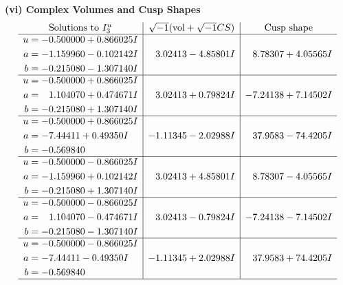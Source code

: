 \documentclass[1p]{elsarticle_modified}
\theoremstyle{definition}
\newcommand{\I}{\sqrt{-1}}
\begin{document}
\newpage\flushleft \textbf{(vi) Complex Volumes and Cusp Shapes}
$$\begin{array}{c|c|c}  
\text{Solutions to }I^u_{3}& \I (\text{vol} + \sqrt{-1}CS) & \text{Cusp shape}\\
 \hline 
\begin{aligned}
u &= -0.500000 + 0.866025 I \\
a &= -1.159960 - 0.102142 I \\
b &= -0.215080 - 1.307140 I\end{aligned}
 & \phantom{-}3.02413 - 4.85801 I & \phantom{-}8.78307 + 4.05565 I \\ \hline\begin{aligned}
u &= -0.500000 + 0.866025 I \\
a &= \phantom{-}1.104070 + 0.474671 I \\
b &= -0.215080 + 1.307140 I\end{aligned}
 & \phantom{-}3.02413 + 0.79824 I & -7.24138 + 7.14502 I \\ \hline\begin{aligned}
u &= -0.500000 + 0.866025 I \\
a &= -7.44411 + 0.49350 I \\
b &= -0.569840\phantom{ +0.000000I}\end{aligned}
 & -1.11345 - 2.02988 I & \phantom{-}37.9583 - 74.4205 I \\ \hline\begin{aligned}
u &= -0.500000 - 0.866025 I \\
a &= -1.159960 + 0.102142 I \\
b &= -0.215080 + 1.307140 I\end{aligned}
 & \phantom{-}3.02413 + 4.85801 I & \phantom{-}8.78307 - 4.05565 I \\ \hline\begin{aligned}
u &= -0.500000 - 0.866025 I \\
a &= \phantom{-}1.104070 - 0.474671 I \\
b &= -0.215080 - 1.307140 I\end{aligned}
 & \phantom{-}3.02413 - 0.79824 I & -7.24138 - 7.14502 I \\ \hline\begin{aligned}
u &= -0.500000 - 0.866025 I \\
a &= -7.44411 - 0.49350 I \\
b &= -0.569840\phantom{ +0.000000I}\end{aligned}
 & -1.11345 + 2.02988 I & \phantom{-}37.9583 + 74.4205 I\\
 \hline 
 \end{array}$$\newpage
\end{document}
